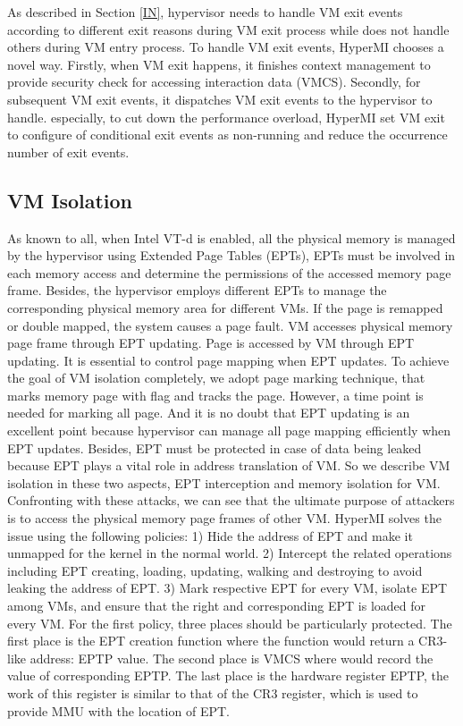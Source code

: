 \documentclass[conference]{IEEEtran}
\begin{document}
As described in Section \ref{IN}, hypervisor needs to handle VM exit events according to different exit reasons during VM exit process while does not handle others during VM entry process. 
To handle VM exit events, HyperMI chooses a novel way.
Firstly, when VM exit happens, it finishes context management to provide security check for accessing interaction data (VMCS). Secondly, for subsequent VM exit events, it dispatches VM exit events to the hypervisor to handle. especially, to cut down the performance overload, HyperMI set VM exit to configure of conditional exit events as non-running and reduce the occurrence number of exit events.
\subsection{VM Isolation}\label{VMISolation}
As known to all, when Intel VT-d is enabled, all the physical memory is managed by the hypervisor using Extended Page Tables (EPTs), EPTs must be involved in each memory access and determine the permissions of the accessed memory page frame. Besides, the hypervisor employs different EPTs to manage the corresponding physical memory area for different VMs. If the page is remapped or double mapped, the system causes a page fault. VM accesses physical memory page frame through EPT updating. 
Page is accessed by VM through EPT updating.
It is essential to control page mapping when EPT updates. To achieve the goal of VM isolation completely, we adopt page marking technique, that marks memory page with flag and tracks the page. However, a time point is needed for marking all page. And it is no doubt that EPT updating is an excellent point because hypervisor can manage all page mapping efficiently when EPT updates. Besides, EPT must be protected in case of data being leaked because EPT plays a vital role in address translation of VM. So we describe VM isolation in these two aspects, EPT interception and memory isolation for VM.
Confronting with these attacks, we can see that the ultimate purpose of attackers is to access the physical memory page frames of other VM. HyperMI solves the issue using the following policies: 1) Hide the address of EPT and make it unmapped for the kernel in the normal world. 2) Intercept the related operations including EPT creating, loading, updating, walking and destroying to avoid leaking the address of EPT. 3) Mark respective EPT for every VM, isolate EPT among VMs, and ensure that the right and corresponding EPT is loaded for every VM.
For the first policy, three places should be particularly protected. The first place is the EPT creation function where the function would return a CR3-like address: EPTP value. The second place is VMCS where would record the value of corresponding EPTP. The last place is the hardware register EPTP, the work of this register is similar to that of the CR3 register, which is used to provide MMU with the location of EPT. 
\end{document}
